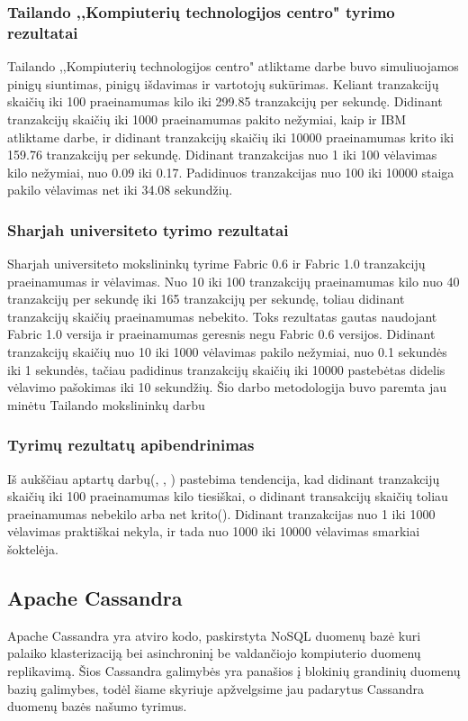 \documentclass{VUMIFPSkursinis}
\begin{document}
		\subsubsection{Tailando ,,Kompiuterių technologijos centro" tyrimo rezultatai}
			Tailando ,,Kompiuterių technologijos centro" atliktame darbe \cite{ThailandPerf} buvo simuliuojamos pinigų siuntimas, pinigų išdavimas ir vartotojų sukūrimas. Keliant tranzakcijų skaičių iki 100 praeinamumas kilo iki 299.85 tranzakcijų per sekundę. Didinant tranzakcijų skaičių iki 1000 praeinamumas pakito nežymiai, kaip ir IBM \cite{IMBResearch} atliktame darbe, ir didinant tranzakcijų skaičių iki 10000 praeinamumas krito iki 159.76 tranzakcijų per sekundę. 
			Didinant tranzakcijas nuo 1 iki 100 vėlavimas kilo nežymiai, nuo 0.09 iki 0.17. Padidinuos tranzakcijas nuo 100 iki 10000 staiga pakilo vėlavimas net iki 34.08 sekundžių.
		\subsubsection{Sharjah universiteto tyrimo rezultatai}
			Sharjah universiteto mokslininkų tyrime \cite{ShaFabPerf} Fabric 0.6 ir Fabric 1.0 tranzakcijų praeinamumas ir vėlavimas. Nuo 10 iki 100 tranzakcijų praeinamumas kilo nuo 40 tranzakcijų per sekundę iki 165 tranzakcijų per sekundę, toliau didinant tranzakcijų skaičių praeinamumas nebekito. Toks rezultatas gautas naudojant Fabric 1.0 versija ir praeinamumas geresnis negu 					Fabric 0.6 versijos. 
			Didinant tranzakcijų skaičių nuo 10 iki 1000 vėlavimas pakilo nežymiai, nuo 0.1 sekundės iki 1 sekundės, tačiau padidinus tranzakcijų skaičių iki 10000 pastebėtas didelis vėlavimo pašokimas iki 10 sekundžių.
			Šio darbo metodologija buvo paremta jau minėtu Tailando mokslininkų darbu \cite{ThailandPerf}
		\subsubsection{Tyrimų rezultatų apibendrinimas}
			Iš aukščiau aptartų darbų(\cite{IMBResearch}, \cite{ThailandPerf}, \cite{ShaFabPerf}) pastebima tendencija, kad didinant tranzakcijų skaičių iki 100 praeinamumas kilo tiesiškai, o didinant transakcijų skaičių toliau praeinamumas nebekilo arba net krito(\cite{ThailandPerf}).
			\newline
			Didinant tranzakcijas nuo 1 iki 1000 vėlavimas praktiškai nekyla, ir tada nuo 1000 iki 10000 vėlavimas smarkiai šoktelėja. 
	\subsection{Apache Cassandra}
		Apache Cassandra yra atviro kodo, paskirstyta NoSQL duomenų bazė kuri palaiko klasterizaciją bei asinchroninį be valdančiojo kompiuterio duomenų replikavimą. Šios Cassandra galimybės yra panašios į blokinių grandinių duomenų bazių galimybes, todėl šiame skyriuje apžvelgsime jau padarytus 
		Cassandra duomenų bazės našumo tyrimus. 
\end{document}
